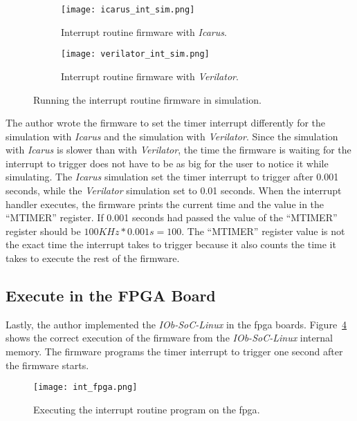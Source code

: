 \begin{figure}[!ht]
    \centering
    \begin{subfigure}[b]{0.49\textwidth}
        \centering
        \texttt{[image: icarus\_int\_sim.png]}
        \caption{Interrupt routine firmware with \textit{Icarus}.}
        \label{fig:icarus_int_sim}
    \end{subfigure}
    \hfill
    \begin{subfigure}[b]{0.49\textwidth}
        \centering
        \texttt{[image: verilator\_int\_sim.png]}
        \caption{Interrupt routine firmware with \textit{Verilator}.}
        \label{fig:verilator_int_sim}
    \end{subfigure}
    \caption{Running the interrupt routine firmware in simulation.}
    \label{fig:int_sim}
\end{figure}

The author wrote the firmware to set the timer interrupt differently for the simulation with \textit{Icarus} and the simulation with \textit{Verilator}. Since the simulation with \textit{Icarus} is slower than with \textit{Verilator}, the time the firmware is waiting for the interrupt to trigger does not have to be as big for the user to notice it while simulating. The \textit{Icarus} simulation set the timer interrupt to trigger after 0.001 seconds, while the \textit{Verilator} simulation set to 0.01 seconds. When the interrupt handler executes, the firmware prints the current time and the value in the \enquote{MTIMER} register. If 0.001 seconds had passed the value of the \enquote{MTIMER} register should be $100KHz*0.001s=100$. The \enquote{MTIMER} register value is not the exact time the interrupt takes to trigger because it also counts the time it takes to execute the rest of the firmware.

\subsection{Execute in the FPGA Board}
Lastly, the author implemented the \textit{IOb-SoC-Linux} in the \acrshort{fpga} boards. Figure~\ref{fig:int_fpga} shows the correct execution of the firmware from the \textit{IOb-SoC-Linux} internal memory. The firmware programs the timer interrupt to trigger one second after the firmware starts.

\begin{figure}[!ht]
    \centering
    \texttt{[image: int\_fpga.png]}
    \caption{Executing the interrupt routine program on the \acrshort{fpga}.}
    \label{fig:int_fpga}
\end{figure}

